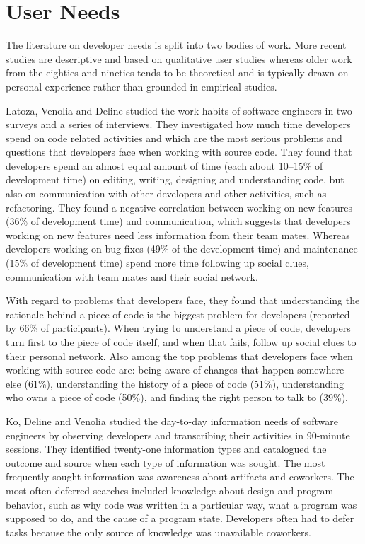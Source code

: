 \section{User Needs}

The literature on developer needs is split into two bodies of work. More recent studies are descriptive and based on qualitative user studies whereas older work from the eighties and nineties tends to be theoretical and is typically drawn on personal experience rather than grounded in empirical studies. 


Latoza, Venolia and Deline \cite{Lato06a} studied the work habits of software engineers in two surveys and a series of interviews. They investigated how much time developers spend on code related activities and which are the most serious problems and questions that developers face when working with source code. They found that developers spend an almost equal amount of time (\ie each about 10--15\% of development time) on editing, writing, designing and understanding code, but also on communication with other developers and other activities, such as refactoring. They found a negative correlation between working on new features (36\% of development time) and communication, which suggests that developers working on new features need less information from their team mates. Whereas developers working on bug fixes (49\% of the development time) and maintenance (15\% of development time) spend more time following up social clues, \ie communication with team mates and their social network. 

With regard to problems that developers face, they found that understanding the rationale behind a piece of code is the biggest problem for developers (reported by 66\% of participants). When trying to understand a piece of code, developers turn first to the piece of code itself, and when that fails, follow up social clues to their personal network. Also among the top problems that developers face when working with source code are: being aware of changes that happen somewhere else (61\%), understanding the history of a piece of code (51\%), understanding who owns a piece of code (50\%), and finding the right person to talk to (39\%).

Ko, Deline and Venolia \cite{Ko07a} studied the day-to-day information needs of software engineers by observing developers and transcribing their activities in 90-minute sessions. They identified twenty-one information types and catalogued the outcome and source when each type of information was sought. The most frequently sought information was awareness about artifacts and coworkers. The most often deferred searches included knowledge about design and program behavior, such as why code was written in a particular way, what a program was supposed to do, and the cause of a program state. Developers often had to defer tasks because the only source of knowledge was unavailable coworkers.  


